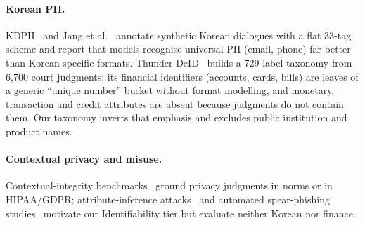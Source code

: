 \paragraph{Korean PII.}
KDPII~\cite{fei2024kdpii} and Jang et al.~\cite{jang2024koreanpiiner} annotate synthetic Korean dialogues with a flat 33-tag scheme and report that models recognise universal PII (email, phone) far better than Korean-specific formats. Thunder-DeID~\cite{hahm2025thunderdeid} builds a 729-label taxonomy from 6{,}700 court judgments; its financial identifiers (accounts, cards, bills) are leaves of a generic ``unique number'' bucket without format modelling, and monetary, transaction and credit attributes are absent because judgments do not contain them. Our taxonomy inverts that emphasis and excludes public institution and product names.

\paragraph{Contextual privacy and misuse.}
Contextual-integrity benchmarks~\cite{mireshghallah2024confaide,shao2024privacylens,fan2024goldcoin,li2025privacibench} ground privacy judgments in norms or in HIPAA/GDPR; attribute-inference attacks~\cite{staab2024beyond} and automated spear-phishing studies~\cite{heiding2024spearphishing} motivate our Identifiability tier but evaluate neither Korean nor finance.
